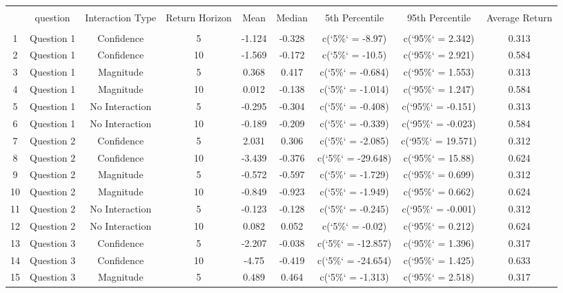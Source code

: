 
\begin{table}[!htbp] \centering 
  \caption{} 
  \label{} 
\begin{tabular}{@{\extracolsep{5pt}} ccccccccc} 
\\[-1.8ex]\hline 
\hline \\[-1.8ex] 
 & question & Interaction Type & Return Horizon & Mean & Median & 5th Percentile & 95th Percentile & Average Return \\ 
\hline \\[-1.8ex] 
1 & Question 1 & Confidence & 5 & -1.124 & -0.328 & c(`5\%` = -8.97) & c(`95\%` = 2.342) & 0.313 \\ 
2 & Question 1 & Confidence & 10 & -1.569 & -0.172 & c(`5\%` = -10.5) & c(`95\%` = 2.921) & 0.584 \\ 
3 & Question 1 & Magnitude & 5 & 0.368 & 0.417 & c(`5\%` = -0.684) & c(`95\%` = 1.553) & 0.313 \\ 
4 & Question 1 & Magnitude & 10 & 0.012 & -0.138 & c(`5\%` = -1.014) & c(`95\%` = 1.247) & 0.584 \\ 
5 & Question 1 & No Interaction & 5 & -0.295 & -0.304 & c(`5\%` = -0.408) & c(`95\%` = -0.151) & 0.313 \\ 
6 & Question 1 & No Interaction & 10 & -0.189 & -0.209 & c(`5\%` = -0.339) & c(`95\%` = -0.023) & 0.584 \\ 
7 & Question 2 & Confidence & 5 & 2.031 & 0.306 & c(`5\%` = -2.085) & c(`95\%` = 19.571) & 0.312 \\ 
8 & Question 2 & Confidence & 10 & -3.439 & -0.376 & c(`5\%` = -29.648) & c(`95\%` = 15.88) & 0.624 \\ 
9 & Question 2 & Magnitude & 5 & -0.572 & -0.597 & c(`5\%` = -1.729) & c(`95\%` = 0.699) & 0.312 \\ 
10 & Question 2 & Magnitude & 10 & -0.849 & -0.923 & c(`5\%` = -1.949) & c(`95\%` = 0.662) & 0.624 \\ 
11 & Question 2 & No Interaction & 5 & -0.123 & -0.128 & c(`5\%` = -0.245) & c(`95\%` = -0.001) & 0.312 \\ 
12 & Question 2 & No Interaction & 10 & 0.082 & 0.052 & c(`5\%` = -0.02) & c(`95\%` = 0.212) & 0.624 \\ 
13 & Question 3 & Confidence & 5 & -2.207 & -0.038 & c(`5\%` = -12.857) & c(`95\%` = 1.396) & 0.317 \\ 
14 & Question 3 & Confidence & 10 & -4.75 & -0.419 & c(`5\%` = -24.654) & c(`95\%` = 1.425) & 0.633 \\ 
15 & Question 3 & Magnitude & 5 & 0.489 & 0.464 & c(`5\%` = -1.313) & c(`95\%` = 2.518) & 0.317 \\ 

\end{tabular}
\end{table}

